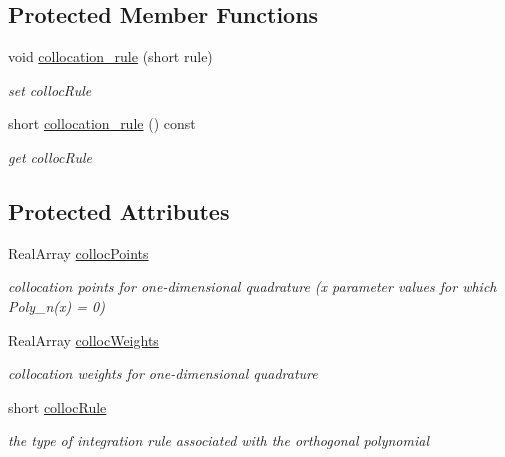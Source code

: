 \subsection*{Protected Member Functions}
\begin{DoxyCompactItemize}
\item 
void \hyperlink{classPecos_1_1OrthogonalPolynomial_addd13d4093ce8cbf2d22c47a47aff610}{collocation\+\_\+rule} (short rule)\label{classPecos_1_1OrthogonalPolynomial_addd13d4093ce8cbf2d22c47a47aff610}

\begin{DoxyCompactList}\small\item\em set colloc\+Rule \end{DoxyCompactList}\item 
short \hyperlink{classPecos_1_1OrthogonalPolynomial_a2e390f265fcc800348dc816d6cc37f86}{collocation\+\_\+rule} () const \label{classPecos_1_1OrthogonalPolynomial_a2e390f265fcc800348dc816d6cc37f86}

\begin{DoxyCompactList}\small\item\em get colloc\+Rule \end{DoxyCompactList}\end{DoxyCompactItemize}
\subsection*{Protected Attributes}
\begin{DoxyCompactItemize}
\item 
Real\+Array \hyperlink{classPecos_1_1OrthogonalPolynomial_abaca893e4d013e2d17107a007af07de0}{colloc\+Points}\label{classPecos_1_1OrthogonalPolynomial_abaca893e4d013e2d17107a007af07de0}

\begin{DoxyCompactList}\small\item\em collocation points for one-\/dimensional quadrature (x parameter values for which Poly\+\_\+n(x) = 0) \end{DoxyCompactList}\item 
Real\+Array \hyperlink{classPecos_1_1OrthogonalPolynomial_aa06828ef22dc2a16825fcdf6a873e0c9}{colloc\+Weights}\label{classPecos_1_1OrthogonalPolynomial_aa06828ef22dc2a16825fcdf6a873e0c9}

\begin{DoxyCompactList}\small\item\em collocation weights for one-\/dimensional quadrature \end{DoxyCompactList}\item 
short \hyperlink{classPecos_1_1OrthogonalPolynomial_abcc1d84cc8e8c8b5a66f720067039f2e}{colloc\+Rule}
\begin{DoxyCompactList}\small\item\em the type of integration rule associated with the orthogonal polynomial \end{DoxyCompactList}\end{DoxyCompactItemize}
